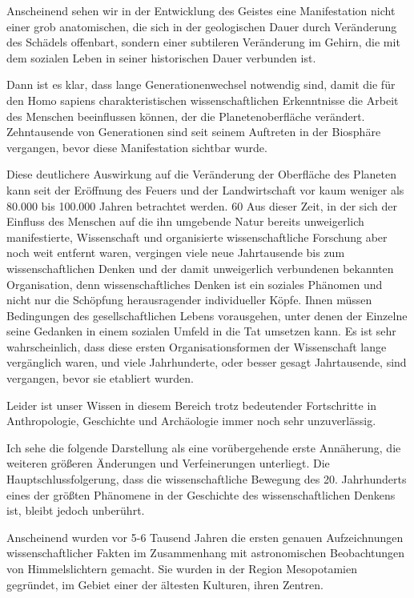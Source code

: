 \documentclass[11pt,a4paper]{book}
\begin{document}
Anscheinend sehen wir in der Entwicklung des Geistes eine Manifestation nicht einer grob anatomischen, die sich in der geologischen Dauer durch Veränderung des Schädels offenbart, sondern einer subtileren Veränderung im Gehirn, die mit dem sozialen Leben in seiner historischen Dauer verbunden ist. 

Dann ist es klar, dass lange Generationenwechsel notwendig sind, damit die für den Homo sapiens charakteristischen wissenschaftlichen Erkenntnisse die Arbeit des Menschen beeinflussen können, der die Planetenoberfläche verändert. Zehntausende von Generationen sind seit seinem Auftreten in der Biosphäre vergangen, bevor diese Manifestation sichtbar wurde. 

Diese deutlichere Auswirkung auf die Veränderung der Oberfläche des Planeten kann seit der Eröffnung des Feuers und der Landwirtschaft vor kaum weniger als 80.000 bis 100.000 Jahren betrachtet werden. 60 Aus dieser Zeit, in der sich der Einfluss des Menschen auf die ihn umgebende Natur bereits unweigerlich manifestierte, Wissenschaft und organisierte wissenschaftliche Forschung aber noch weit entfernt waren, vergingen viele neue Jahrtausende bis zum wissenschaftlichen Denken und der damit unweigerlich verbundenen bekannten Organisation, denn wissenschaftliches Denken ist ein soziales Phänomen und nicht nur die Schöpfung herausragender individueller Köpfe. Ihnen müssen Bedingungen des gesellschaftlichen Lebens vorausgehen, unter denen der Einzelne seine Gedanken in einem sozialen Umfeld in die Tat umsetzen kann. Es ist sehr wahrscheinlich, dass diese ersten Organisationsformen der Wissenschaft lange vergänglich waren, und viele Jahrhunderte, oder besser gesagt Jahrtausende, sind vergangen, bevor sie etabliert wurden. 

Leider ist unser Wissen in diesem Bereich trotz bedeutender Fortschritte in Anthropologie, Geschichte und Archäologie immer noch sehr unzuverlässig. 

Ich sehe die folgende Darstellung als eine vorübergehende erste Annäherung, die weiteren größeren Änderungen und Verfeinerungen unterliegt. Die Hauptschlussfolgerung, dass die wissenschaftliche Bewegung des 20. Jahrhunderts eines der größten Phänomene in der Geschichte des wissenschaftlichen Denkens ist, bleibt jedoch unberührt. 

Anscheinend wurden vor 5-6 Tausend Jahren die ersten genauen Aufzeichnungen wissenschaftlicher Fakten im Zusammenhang mit astronomischen Beobachtungen von Himmelslichtern gemacht. Sie wurden in der Region Mesopotamien gegründet, im Gebiet einer der ältesten Kulturen, ihren Zentren. 
\end{document}
